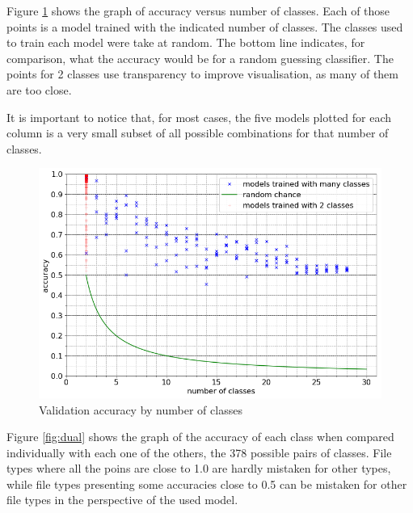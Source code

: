 Figure \ref{fig:nclasses} shows the graph of accuracy versus number of classes.  Each of those points is a model trained with the indicated number of classes. The classes used to train each model were take at random. The bottom line indicates, for comparison, what the accuracy would be for a random guessing classifier. The points for 2 classes use transparency to improve visualisation, as many of them are too close.

It is important to notice that, for most cases, the five models plotted for each column is a very small subset of all possible combinations for that number of classes. 



\noindent
\begin{figure}[htb!]
\centering\includegraphics[width=1.0\textwidth]{content/nclasses.png}
\caption{\label{fig:nclasses}Validation accuracy by number of classes}%
\end{figure}

Figure \ref{fig:dual} shows the graph of the accuracy of each class when compared individually with each one of the others, the 378 possible pairs of classes. File types where all the poins are close to 1.0 are hardly mistaken for other types, while file types presenting some accuracies close to 0.5 can be mistaken for other file types in the perspective of the used model.


